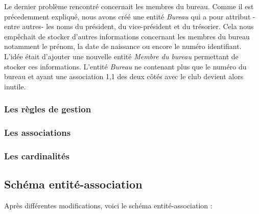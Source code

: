 \documentclass{article}
\begin{document}
Le dernier problème rencontré concernait les membres du bureau. Comme il est précedemment expliqué, nous avons créé une entité \textit{Bureau} qui a pour attribut -entre autres- les noms du président, du vice-président et du trésorier. Cela nous empêchait de stocker d'autres informations concernant les membres du bureau notamment le prénom, la date de naissance ou encore le numéro identifiant. L'idée était d'ajouter une nouvelle entité \textit{Membre du bureau} permettant de stocker ces informations. L'entité \textit{Bureau} ne contenant plus que le numéro du bureau et ayant une association 1,1 des deux côtés avec le club devient alors inutile.  

\subsubsection*{Les règles de gestion}

\subsubsection*{Les associations}

\subsubsection*{Les cardinalités}


\newpage

\subsection{Schéma entité-association }
Après différentes modifications, voici le schéma entité-association :
 
\end{document}

